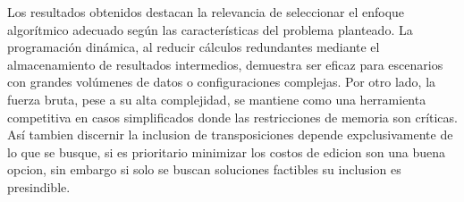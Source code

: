 Los resultados obtenidos destacan la relevancia de seleccionar el enfoque algorítmico adecuado según las características 
del problema planteado. La programación dinámica, al reducir cálculos redundantes mediante el almacenamiento de resultados 
intermedios, demuestra ser eficaz para escenarios con grandes volúmenes de datos o configuraciones complejas. Por otro lado, 
la fuerza bruta, pese a su alta complejidad, se mantiene como una herramienta competitiva en casos simplificados donde las 
restricciones de memoria son críticas. Así tambien discernir la inclusion de transposiciones depende expclusivamente de lo que se busque,
si es prioritario minimizar los costos de edicion son una buena opcion, sin embargo si solo se buscan soluciones factibles su inclusion es
presindible.\\